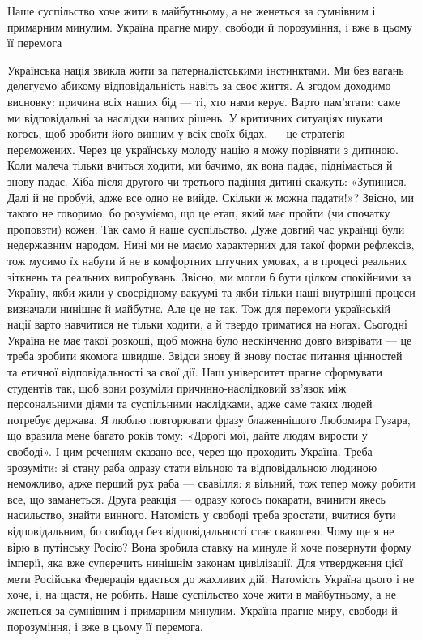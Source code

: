 \begin{zznagolos}
Наше суспільство хоче жити в майбутньому, а не женеться за сумнівним і
примарним минулим. Україна прагне миру, свободи й порозуміння, і вже в цьому її
перемога	
\end{zznagolos}

Українська нація звикла жити за патерналістськими інстинктами. Ми без вагань
делегуємо абикому відповідальність навіть за своє життя. А згодом доходимо
висновку: причина всіх наших бід — ті, хто нами керує. Варто пам’ятати: саме ми
відповідальні за наслідки наших рішень. У критичних ситуаціях шукати когось,
щоб зробити його винним у всіх своїх бідах, — це стратегія переможених. Через
це українську молоду націю я можу порівняти з дитиною. Коли малеча тільки
вчиться ходити, ми бачимо, як вона падає, піднімається й знову падає. Хіба
після другого чи третього падіння дитині скажуть: «Зупинися. Далі й не пробуй,
адже все одно не вийде. Скільки ж можна падати!»? Звісно, ми такого не
говоримо, бо розуміємо, що це етап, який має пройти (чи спочатку проповзти)
кожен. Так само й наше суспільство. Дуже довгий час українці були недержавним
народом. Нині ми не маємо характерних для такої форми рефлексів, тож мусимо їх
набути й не в комфортних штучних умовах, а в процесі реальних зіткнень та
реальних випробувань. Звісно, ми могли б бути цілком спокійними за Україну,
якби жили у своєрідному вакуумі та якби тільки наші внутрішні процеси визначали
нинішнє й майбутнє. Але це не так. Тож для перемоги українській нації варто
навчитися не тільки ходити, а й твердо триматися на ногах. Сьогодні Україна не
має такої розкоші, щоб можна було нескінченно довго визрівати — це треба
зробити якомога швидше. Звідси знову й знову постає питання цінностей та
етичної відповідальності за свої дії. Наш університет прагне сформувати
студентів так, щоб вони розуміли причинно-наслідковий зв’язок між персональними
діями та суспільними наслідками, адже саме таких людей потребує держава. Я
люблю повторювати фразу блаженнішого Любомира Гузара, що вразила мене багато
років тому: «Дорогі мої, дайте людям вирости у свободі». І цим реченням сказано
все, через що проходить Україна. Треба зрозуміти: зі стану раба одразу стати
вільною та відповідальною людиною неможливо, адже перший рух раба — свавілля: я
вільний, тож тепер можу робити все, що заманеться. Друга реакція — одразу
когось покарати, вчинити якесь насильство, знайти винного. Натомість у свободі
треба зростати, вчитися бути відповідальним, бо свобода без відповідальності
стає сваволею. Чому ще я не вірю в путінську Росію? Вона зробила ставку на
минуле й хоче повернути форму імперії, яка вже суперечить нинішнім законам
цивілізації. Для утвердження цієї мети Російська Федерація вдається до жахливих
дій. Натомість Україна цього і не хоче, і, на щастя, не робить. Наше
суспільство хоче жити в майбутньому, а не женеться за сумнівним і примарним
минулим. Україна прагне миру, свободи й порозуміння, і вже в цьому її перемога. 

